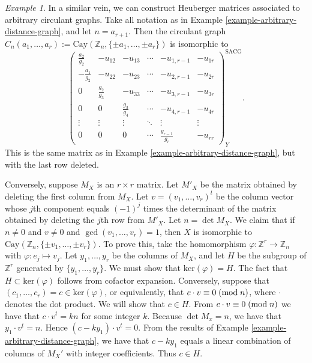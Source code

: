 \documentclass{article}
\newcommand*\Mod[1]{ \; (\textup{mod} \; #1 )}
\renewcommand{\phi}{\varphi}
\theoremstyle{definition}
\theoremstyle{remark}
\newtheorem{Ex}[Thm]{Example}
\begin{document}
\begin{Ex}\label{example-arbitrary-circulant-graph} In a similar vein, we can construct Heuberger matrices associated to arbitrary circulant graphs.  Take all notation as in Example \ref{example-arbitrary-distance-graph}, and let $n=a_{r+1}$.  Then the circulant graph $C_n(a_1,\dots,a_r):=\text{Cay}(\mathbb{Z}_n,\{\pm a_1,\dots,\pm a_r\})$ is isomorphic to \[\begin{pmatrix}
\frac{a_2}{g_2} & -u_{12} & -u_{13} & \cdots & -u_{1,r-1} & -u_{1r}\\
-\frac{a_1}{g_2} & -u_{22} & -u_{23} & \cdots & -u_{2,r-1} & -u_{2r}\\
0 & \frac{g_2}{g_3} & -u_{33} & \cdots & -u_{3,r-1} & -u_{3r}\\
0 & 0 & \frac{g_3}{g_4} & \cdots & -u_{4,r-1} & -u_{4r}\\
\vdots & \vdots & \vdots & \ddots & \vdots & \vdots\\
0 & 0 & 0 & \cdots &  \frac{g_{r-1}}{g_r} & -u_{rr}\end{pmatrix}^{\text{SACG}}_Y.\]This is the same matrix as in Example \ref{example-arbitrary-distance-graph}, but with the last row deleted.

Conversely, suppose $M_X$ is an $r\times r$ matrix.  Let $M'_X$ be the matrix obtained by deleting the first column from $M_X$.  Let $v=(v_1,\dots,v_{r})^t$ be the column vector whose $j$th component equals $(-1)^j$ times the determinant of the matrix obtained by deleting the $j$th row from $M'_X$.  Let $n=\det M_X$.  We claim that if $n\neq 0$ and $v\neq 0$ and $\gcd(v_1,\dots,v_{r})=1$, then $X$ is isomorphic to $\text{Cay}(\mathbb{Z}_n,\{\pm v_1,\dots,\pm v_{r}\})$.  To prove this, take the homomorphism $\phi\colon\mathbb{Z}^{r}\to \mathbb{Z}_n$ with $\phi\colon e_j\mapsto v_j$.  Let $y_1,\dots,y_r$ be the columns of $M_X$, and let $H$ be the subgroup of $\mathbb{Z}^{r}$ generated by $\{y_1,\dots,y_r\}$.  We must show that $\text{ker}(\phi)=H$.  The fact that $H\subset \text{ker}(\phi)$ follows from cofactor expansion.  Conversely, suppose that $(c_1,\dots,c_{r})=c\in \text{ker}(\phi)$, or equivalently, that $c\cdot v\equiv 0\Mod{n}$, where $\cdot $ denotes the dot product.  We will show that $c\in H$.  From $c\cdot v\equiv 0\Mod{n}$ we have that $c\cdot v^t = kn$ for some integer $k$.  Because $\det M_x=n$, we have that $y_1\cdot v^t=n$.  Hence $(c-ky_1)\cdot v^t =0$.  From the results of Example \ref{example-arbitrary-distance-graph}, we have that $c-ky_1$ equals a linear combination of columns of $M_X'$ with integer coefficients.  Thus $c\in H$.


\end{Ex}
\end{document}
